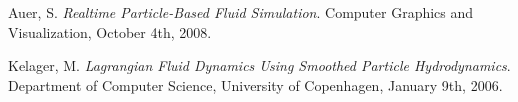 \documentclass[a4paper,12pt,twoside]{report}
\begin{document}








\begin{thebibliography}{11}

  Auer, S.
  \emph{Realtime Particle-Based Fluid Simulation}.
  Computer Graphics and Visualization,
  October 4th,
  2008.
  
  Kelager, M.
  \emph{Lagrangian Fluid Dynamics Using Smoothed Particle Hydrodynamics}.
  Department of Computer Science, University of Copenhagen,
  January 9th,
  2006.

\end{thebibliography}
\end{document}
